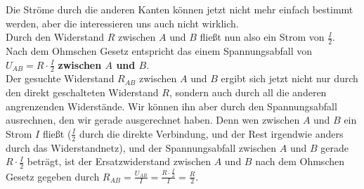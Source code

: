 \begin{Answer}[ref = infnet]
\begin{center}
							\end{center}
					Die Ströme durch die anderen Kanten können jetzt nicht mehr einfach bestimmt werden, aber die interessieren uns auch nicht wirklich.\\
					Durch den Widerstand $R$ zwischen $A$ und $B$ fließt nun also ein Strom von $\frac{I}{2}$. Nach dem Ohmschen Gesetz entspricht das einem Spannungsabfall von $U_{AB} =  R \cdot  \frac{I}{2}$ \textbf{zwischen $A$ und $B$}.\\
					Der gesuchte Widerstand $R_{AB}$ zwischen $A$ und $B$ ergibt sich jetzt nicht nur durch den direkt geschalteten Widerstand $R$, sondern auch durch all die anderen angrenzenden Widerstände. Wir können ihn aber durch den Spannungsabfall ausrechnen, den wir gerade ausgerechnet haben. Denn wen zwischen $A$ und $B$ ein Strom $I$ fließt ($\frac{I}{2}$ durch die direkte Verbindung, und der Rest irgendwie anders durch das Widerstandnetz), und der Spannungsabfall zwischen $A$ und $B$ gerade $R\cdot \frac{I}{2}$ beträgt, ist der Ersatzwiderstand zwischen $A$ und $B$ nach dem Ohmschen Gesetz gegeben durch $R_{AB} = \frac{U_{AB}}{I} = \frac{R\cdot \frac{I}{2}}{I} = \frac{R}{2}$.
			
\end{Answer}